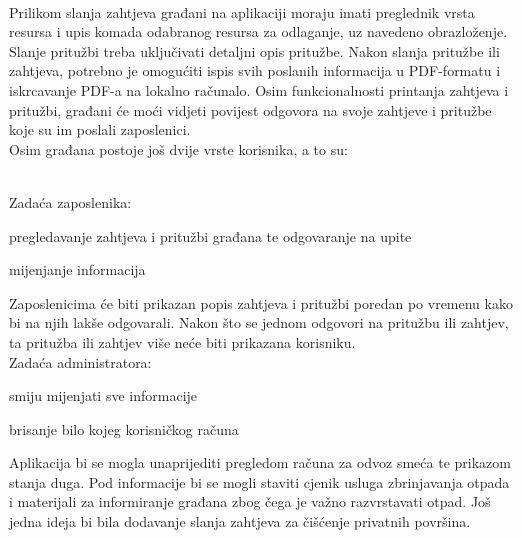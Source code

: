 		\\
		
		Prilikom slanja zahtjeva građani na aplikaciji moraju imati preglednik vrsta resursa i upis komada odabranog resursa za odlaganje, uz navedeno obrazloženje. Slanje pritužbi treba uključivati detaljni opis pritužbe. Nakon slanja pritužbe ili zahtjeva, potrebno je omogućiti ispis svih poslanih informacija u PDF-formatu i iskrcavanje PDF-a na lokalno računalo. Osim funkcionalnosti printanja zahtjeva i pritužbi, građani će moći vidjeti povijest odgovora na svoje zahtjeve i pritužbe koje su im poslali zaposlenici.\\
		
		\noindent Osim građana postoje još dvije vrste korisnika, a to su:
		
		\begin{packed_item}
			\item {}
			\item {}
		\end{packed_item}
		\text{}\\
		Zadaća zaposlenika:
		
		\begin{packed_item}
			\item pregledavanje zahtjeva i pritužbi građana te odgovaranje na upite
			\item mijenjanje informacija
		\end{packed_item}
	
		  Zaposlenicima će biti prikazan popis zahtjeva i pritužbi poredan po vremenu kako bi na njih lakše odgovarali. Nakon što se jednom odgovori na pritužbu ili zahtjev, ta pritužba ili zahtjev više neće biti prikazana korisniku.\\
		  
        \noindent Zadaća administratora:
        
        \begin{packed_item}
        	\item smiju mijenjati sve informacije
        	\item brisanje bilo kojeg korisničkog računa
        \end{packed_item}
		
		
		Aplikacija bi se mogla unaprijediti pregledom računa za odvoz smeća te prikazom stanja duga. 
		Pod informacije bi se mogli staviti cjenik usluga zbrinjavanja otpada i materijali za informiranje građana zbog čega je važno razvrstavati otpad. Još jedna ideja bi bila dodavanje slanja zahtjeva za čišćenje privatnih površina.
		
		\eject
